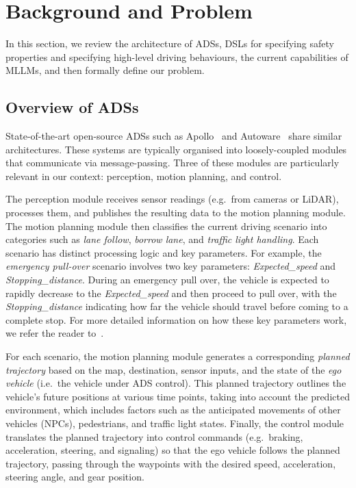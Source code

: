 \section{Background and Problem}
\label{sec:overview_and_background}
In this section, we review the architecture of ADSs, DSLs for specifying safety properties and specifying high-level driving behaviours, the current capabilities of MLLMs, and then formally define our problem.

\subsection{Overview of ADSs}
State-of-the-art open-source ADSs such as Apollo~\cite{apollo90} and Autoware~\cite{autoware} share similar architectures. These systems are typically organised into loosely-coupled modules that communicate via message-passing. Three of these modules are particularly relevant in our context: perception, motion planning, and control.

The perception module receives sensor readings (e.g.~from cameras or LiDAR), processes them, and publishes the resulting data to the motion planning module. The motion planning module then classifies the current driving scenario into categories such as \emph{lane follow}, \emph{borrow lane}, and \emph{traffic light handling}. Each scenario has distinct processing logic and key parameters. For example, the \emph{emergency pull-over} scenario involves two key parameters: \emph{Expected\_speed} and \emph{Stopping\_distance}. During an emergency pull over, the vehicle is expected to rapidly decrease to the \emph{Expected\_speed} and then proceed to pull over, with the \emph{Stopping\_distance} indicating how far the vehicle should travel before coming to a complete stop. For more detailed information on how these key parameters work, we refer the reader to~\cite{apollo90, autoware}.

For each scenario, the motion planning module generates a corresponding \emph{planned trajectory} based on the map, destination, sensor inputs, and the state of the \emph{ego vehicle} (i.e.~the vehicle under ADS control). This planned trajectory outlines the vehicle's future positions at various time points, taking into account the predicted environment, which includes factors such as the anticipated movements of other vehicles (NPCs), pedestrians, and traffic light states.
Finally, the control module translates the planned trajectory into control commands (e.g.~braking, acceleration, steering, and signaling) so that the ego vehicle follows the planned trajectory, passing through the waypoints with the desired speed, acceleration, steering angle, and gear position. 


